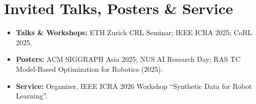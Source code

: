 \documentclass[11pt,a4paper]{article}
\begin{document}
\section{Invited Talks, Posters \& Service}
\begin{itemize}
  \item \textbf{Talks \& Workshops:} ETH Zurich CRL Seminar; IEEE ICRA 2025; CoRL 2025.
  \item \textbf{Posters:} ACM SIGGRAPH Asia 2025; NUS AI Research Day; RAS TC Model-Based Optimization for Robotics (2025).
  \item \textbf{Service:} Organizer, IEEE ICRA 2026 Workshop ``Synthetic Data for Robot Learning''.
\end{itemize}
\end{document}

